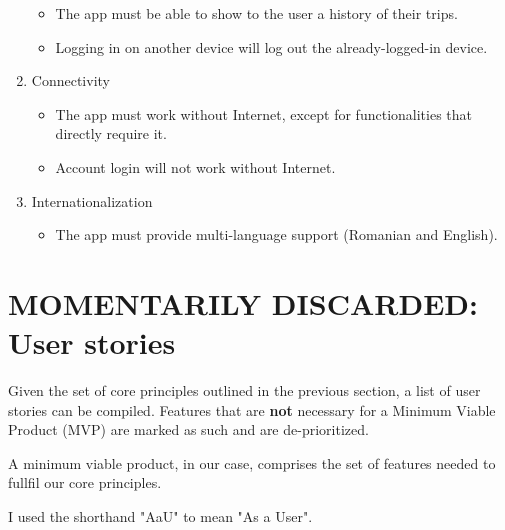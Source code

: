 \begin{enumerate}
\begin{itemize}
              \item The app must be able to show to the user a history of their trips.
              \item Logging in on another device will log out the already-logged-in device.
          \end{itemize}
    \item Connectivity
          \begin{itemize}
              \item The app must work without Internet, except for functionalities that directly require it.
              \item Account login will not work without Internet.
          \end{itemize}
          \item{Internationalization}
          \begin{itemize}
              \item The app must provide multi-language support (Romanian and English).
          \end{itemize}
\end{enumerate}

\iffalse
    \section{MOMENTARILY DISCARDED: User stories}

    Given the set of core principles outlined in the previous section, a list of user stories can be compiled. Features that are \textbf{not} necessary for a Minimum Viable Product (MVP) are marked as such and are de-prioritized.

    A minimum viable product, in our case, comprises the set of features needed to fullfil our core principles.

    I used the shorthand "AaU" to mean "As a User".

